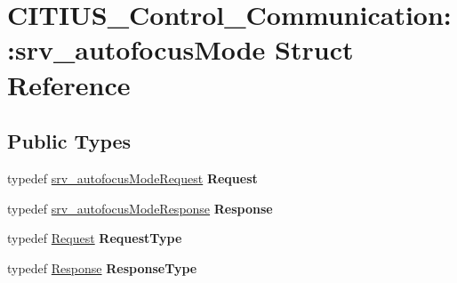 \hypertarget{struct_c_i_t_i_u_s___control___communication_1_1srv__autofocus_mode}{\section{\-C\-I\-T\-I\-U\-S\-\_\-\-Control\-\_\-\-Communication\-:\-:srv\-\_\-autofocus\-Mode \-Struct \-Reference}
\label{struct_c_i_t_i_u_s___control___communication_1_1srv__autofocus_mode}
}
\subsection*{\-Public \-Types}
\begin{DoxyCompactItemize}
\item 
\hypertarget{struct_c_i_t_i_u_s___control___communication_1_1srv__autofocus_mode_a67eb03c382f019ce79018db5ef35b257}{typedef \hyperlink{struct_c_i_t_i_u_s___control___communication_1_1srv__autofocus_mode_request__}{srv\-\_\-autofocus\-Mode\-Request} {\bfseries \-Request}}\label{struct_c_i_t_i_u_s___control___communication_1_1srv__autofocus_mode_a67eb03c382f019ce79018db5ef35b257}

\item 
\hypertarget{struct_c_i_t_i_u_s___control___communication_1_1srv__autofocus_mode_af9b5d8a1d1b4e4a94dd0e2e0fd3de41d}{typedef \hyperlink{struct_c_i_t_i_u_s___control___communication_1_1srv__autofocus_mode_response__}{srv\-\_\-autofocus\-Mode\-Response} {\bfseries \-Response}}\label{struct_c_i_t_i_u_s___control___communication_1_1srv__autofocus_mode_af9b5d8a1d1b4e4a94dd0e2e0fd3de41d}

\item 
\hypertarget{struct_c_i_t_i_u_s___control___communication_1_1srv__autofocus_mode_a6441f1054c569ca142a625384de68f5b}{typedef \hyperlink{struct_c_i_t_i_u_s___control___communication_1_1srv__autofocus_mode_request__}{\-Request} {\bfseries \-Request\-Type}}\label{struct_c_i_t_i_u_s___control___communication_1_1srv__autofocus_mode_a6441f1054c569ca142a625384de68f5b}

\item 
\hypertarget{struct_c_i_t_i_u_s___control___communication_1_1srv__autofocus_mode_a32972205a1643c0b4e76e407bd7b905c}{typedef \hyperlink{struct_c_i_t_i_u_s___control___communication_1_1srv__autofocus_mode_response__}{\-Response} {\bfseries \-Response\-Type}}\label{struct_c_i_t_i_u_s___control___communication_1_1srv__autofocus_mode_a32972205a1643c0b4e76e407bd7b905c}

\end{DoxyCompactItemize}
